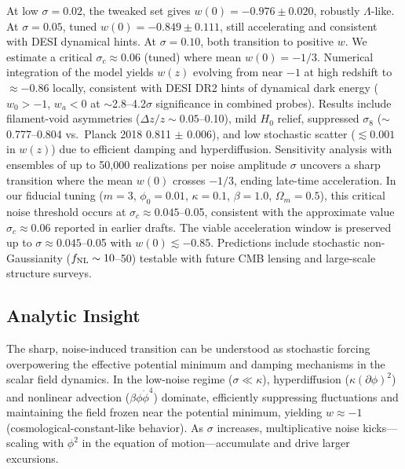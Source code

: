 \documentclass[preprint]{aastex7}
\begin{document}
At low \( \sigma = 0.02 \), the tweaked set gives \( w(0) = -0.976 \pm 0.020 \), robustly \( \Lambda \)-like. At \( \sigma = 0.05 \), tuned \( w(0) = -0.849 \pm 0.111 \), still accelerating and consistent with DESI dynamical hints. At \( \sigma = 0.10 \), both transition to positive \( w \). We estimate a critical \( \sigma_c \approx 0.06 \) (tuned) where mean \( w(0) = -1/3 \). Numerical integration of the model yields \( w(z) \) evolving from near \( -1 \) at high redshift to \( \approx -0.86 \) locally, consistent with DESI DR2 hints of dynamical dark energy (\( w_0 > -1 \), \( w_a < 0 \) at $\sim$2.8--4.2\( \sigma \) significance in combined probes). Results include filament-void asymmetries (\( \Delta z/z \sim 0.05 \)--0.10), mild \( H_0 \) relief, suppressed \( \sigma_8 \) ($\sim$0.777--0.804 vs.\ Planck 2018 0.811 \( \pm \) 0.006), and low stochastic scatter (\( \lesssim 0.001 \) in \( w(z) \)) due to efficient damping and hyperdiffusion. Sensitivity analysis with ensembles of up to 50,000 realizations per noise amplitude \( \sigma \) uncovers a sharp transition where the mean \( w(0) \) crosses \( -1/3 \), ending late-time acceleration. In our fiducial tuning (\( m=3 \), \( \phi_0=0.01 \), \( \kappa=0.1 \), \( \beta=1.0 \), \( \Omega_m=0.5 \)), this critical noise threshold occurs at \( \sigma_c \approx 0.045 \)--0.05, consistent with the approximate value \( \sigma_c \approx 0.06 \) reported in earlier drafts. The viable acceleration window is preserved up to \( \sigma \approx 0.045 \)--0.05 with \( w(0) \lesssim -0.85 \). Predictions include stochastic non-Gaussianity (\( f_{\rm NL} \sim 10 \)--50) testable with future CMB lensing and large-scale structure surveys.


\subsection{Analytic Insight}

The sharp, noise-induced transition can be understood as stochastic forcing overpowering the effective potential minimum and damping mechanisms in the scalar field dynamics. In the low-noise regime (\( \sigma \ll \kappa \)), hyperdiffusion (\( \kappa (\partial \phi)^2 \)) and nonlinear advection (\( \beta \phi \dot{\phi}^4 \)) dominate, efficiently suppressing fluctuations and maintaining the field frozen near the potential minimum, yielding \( w \approx -1 \) (cosmological-constant-like behavior). As \( \sigma \) increases, multiplicative noise kicks---scaling with \( \phi^2 \) in the equation of motion---accumulate and drive larger excursions.
\end{document}
